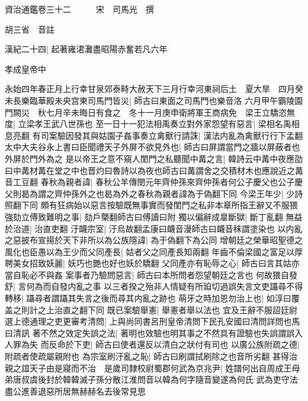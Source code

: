 資治通鑑卷三十二　　　宋　司馬光　撰

胡三省　音註

漢紀二十四|{
	起著雍涒灘盡昭陽赤奮若凡六年}


孝成皇帝中

永始四年春正月上行幸甘泉郊泰畤大赦天下三月行幸河東祠后土　夏大旱　四月癸未長樂臨華殿未央宫東司馬門皆災|{
	師古曰東面之司馬門也樂音洛}
六月甲午霸陵園門闕災　秋七月辛未晦日有食之　冬十一月庚申衛將軍王商病免　梁王立驕恣無度|{
	立梁孝王武八世孫也}
至一日十一犯法相禹奏立對外家怨望有惡言|{
	梁相名禹相息亮翻}
有司案驗因發其與姑園子姦事奏立禽獸行請誅|{
	漢法内亂為禽獸行行下孟翻}
太中大夫谷永上書曰臣聞禮天子外屏不欲見外也|{
	師古曰屏謂當門之牆以屏蔽者也外屏於門外為之}
是以帝王之意不窺人閨門之私聽聞中冓之言|{
	韓詩云中冓中夜應劭曰中冓材冓在堂之中也晋灼曰魯詩以為夜也師古曰冓謂舍之交積材木也應說近之冓音工豆翻}
春秋為親者諱|{
	春秋公羊傳閔元年齊仲孫來齊仲孫者何公子慶父也公子慶父則曷為謂之齊仲孫外之也曷為外之春秋為親者諱為于偽翻下同}
今梁王年少|{
	少詩照翻下同}
頗有狂病始以惡言按驗既無事實而發閨門之私非本章所指王辭又不服猥強劾立傅致難明之事|{
	劾戶槩翻師古曰傅讀曰附}
獨以偏辭成辠斷獄|{
	斷丁亂翻}
無益於治道|{
	治直吏翻}
汙衊宗室|{
	汙烏故翻孟康曰衊音漫師古曰衊音秣謂塗染也}
以内亂之惡披布宣揚於天下非所以為公族隱諱|{
	為于偽翻下為公同}
增朝廷之榮華昭聖德之風化也臣愚以為王少而父同產長|{
	姑者父之同產長知兩翻}
年齒不倫梁國之富足以厚聘美女招致妖麗|{
	妖巧也艷也好也妖於驕翻}
父同產亦有恥辱之心|{
	師古曰言其姑亦當自恥必不與姦}
案事者乃驗問惡言|{
	師古曰本所問者怨望朝廷之言也}
何故猥自發舒|{
	言何為而自發内亂之事}
以三者揆之殆非人情疑有所廹切過誤失言文吏躡尋不得轉移|{
	躡尋者謂躡其失言之後而尋其内亂之跡也}
萌牙之時加恩勿治上也|{
	如淳曰覆盖之則計之上治直之翻下同}
既已案驗舉憲|{
	舉憲者舉以法也}
宜及王辭不服詔廷尉選上德通理之吏更審考清問|{
	上與尚同書呂刑皇帝清問下民孔安國曰清問詳問也馬曰清訊}
著不然之效定失誤之法|{
	著明也效驗也明其事之不然具有證驗也失誤謂誤入人罪為失}
而反命於下吏|{
	師古曰使者還反以清白之狀付有司也}
以廣公族附疏之德|{
	附疏者使疏屬親附也}
為宗室刷汙亂之恥|{
	師古曰刷謂拭刷除之也音所劣翻}
甚得治親之誼天子由是寢而不治　是歲司隸校尉蜀郡何武為京兆尹|{
	姓譜何出自周成王母弟唐叔虞後封於韓韓滅子孫分散江淮問音以韓為何字隨音變遂為何氏}
武為吏守法盡公進善退惡所居無赫赫名去後常見思

